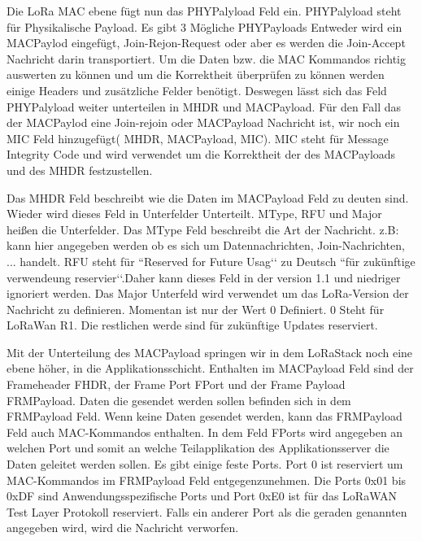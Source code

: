 \documentclass[a4paper,12pt]{article}
\begin{document}
            Die LoRa MAC ebene fügt nun das PHYPalyload Feld ein. PHYPalyload steht für Physikalische Payload. Es gibt 
            3 Mögliche PHYPayloads Entweder wird ein MACPaylod eingefügt, Join-Rejon-Request oder aber es werden die Join-Accept Nachricht darin transportiert. Um die Daten bzw. die MAC Kommandos richtig auswerten zu können und um die Korrektheit überprüfen zu können werden einige Headers und zusätzliche Felder benötigt. Deswegen lässt sich das Feld PHYPalyload weiter unterteilen in MHDR und MACPayload. Für den Fall das der MACPaylod eine Join-rejoin oder MACPayload Nachricht ist, wir noch ein MIC Feld hinzugefügt( MHDR, MACPayload, MIC). MIC steht für Message Integrity Code und wird verwendet um die Korrektheit der des MACPayloads und des MHDR festzustellen.

            Das MHDR Feld beschreibt wie die Daten im MACPayload Feld zu deuten sind. Wieder wird dieses Feld in 
            Unterfelder Unterteilt. MType, RFU und Major heißen die Unterfelder. Das MType Feld beschreibt die Art der 
            Nachricht. z.B: kann hier angegeben werden ob es sich um Datennachrichten, Join-Nachrichten, ... handelt. 
            RFU steht für ``Reserved for Future Usag‘‘ zu Deutsch ``für zukünftige verwendeung reservier‘‘.Daher kann 
            dieses Feld in der version 1.1 und niedriger ignoriert werden. Das Major Unterfeld wird verwendet um das 
            LoRa-Version der Nachricht zu definieren. Momentan ist nur der Wert 0 Definiert. 0 Steht für LoRaWan R1. 
            Die restlichen werde sind für zukünftige Updates reserviert.

            Mit der Unterteilung des MACPayload springen wir in dem LoRaStack noch eine ebene höher, in die 
            Applikationsschicht. Enthalten im MACPayload Feld sind der Frameheader FHDR, der Frame Port FPort und der 
            Frame Payload FRMPayload. Daten die gesendet werden sollen befinden sich in dem FRMPayload Feld. Wenn keine
            Daten gesendet werden, kann das FRMPayload Feld auch MAC-Kommandos enthalten. In dem Feld FPorts wird 
            angegeben an welchen Port und somit an welche Teilapplikation des Applikationsserver die Daten geleitet 
            werden sollen. Es gibt einige feste Ports. Port 0 ist reserviert um MAC-Kommandos im FRMPayload Feld 
            entgegenzunehmen. Die Ports 0x01 bis 0xDF sind Anwendungsspezifische Ports und Port 0xE0 ist für das 
            LoRaWAN Test Layer Protokoll reserviert. Falls ein anderer Port als die geraden genannten angegeben wird, 
            wird die Nachricht verworfen. 
\end{document}
